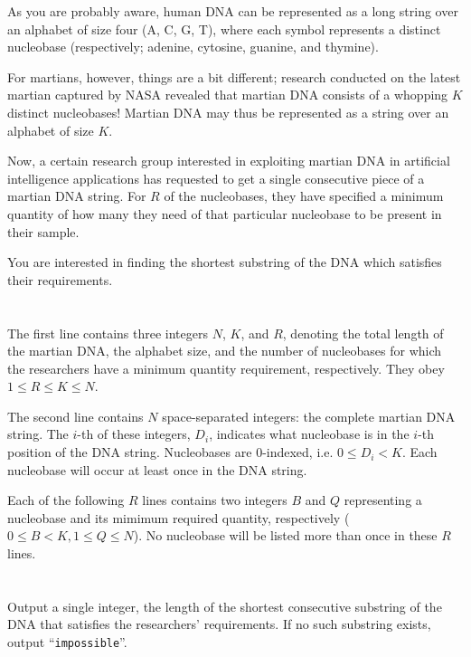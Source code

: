 \ifx\boi\undefined\fi
\def\version{jury-1}
As you are probably aware, human DNA can be represented as a long string over
an alphabet of size four ({A, C, G, T}), where each symbol represents a
distinct nucleobase (respectively; adenine, cytosine, guanine, and thymine).

For martians, however, things are a bit different; research conducted on the
latest martian captured by NASA revealed that martian DNA consists of a
whopping $K$ distinct nucleobases! Martian DNA may thus be represented as a
string over an alphabet of size $K$.

Now, a certain research group interested in exploiting martian DNA in
artificial intelligence applications has requested to get a single consecutive
piece of a martian DNA string. For $R$ of the nucleobases, they have specified
a minimum quantity of how many they need of that particular nucleobase to be
present in their sample.

You are interested in finding the shortest substring of the DNA which satisfies their requirements.

\section*{}
The first line contains three integers $N$, $K$, and $R$, denoting the
total length of the martian DNA, the alphabet size, and the
number of nucleobases for which the researchers have a minimum quantity
requirement, respectively. They obey $1 \le R \le K \le N$.

The second line contains $N$ space-separated integers: the complete martian
DNA string. The $i$-th of these integers, $D_i$, indicates what nucleobase is
in the $i$-th position of the DNA string. Nucleobases are $0$-indexed, i.e. $0
\leq D_i < K$. Each nucleobase will occur at least once in the DNA string.

Each of the following $R$ lines contains two integers $B$ and $Q$ representing
a nucleobase and its mimimum required quantity, respectively ($0 \le B < K, 1 \le Q \le N$).
No nucleobase will be listed more than once in these $R$ lines.

\section*{\outputsection}
Output a single integer, the length of the shortest consecutive substring of
the DNA that satisfies the researchers' requirements. If no such substring
exists, output ``\texttt{impossible}''.

